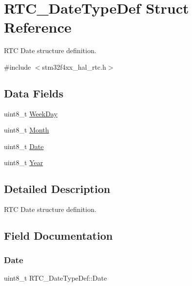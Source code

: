 \hypertarget{struct_r_t_c___date_type_def}{}\section{R\+T\+C\+\_\+\+Date\+Type\+Def Struct Reference}
\label{struct_r_t_c___date_type_def}


R\+TC Date structure definition.  




{\ttfamily \#include $<$stm32f4xx\+\_\+hal\+\_\+rtc.\+h$>$}

\subsection*{Data Fields}
\begin{DoxyCompactItemize}
\item 
uint8\+\_\+t \hyperlink{struct_r_t_c___date_type_def_aff0238fae9aa5fe6dc30ca2833878e45}{Week\+Day}
\item 
uint8\+\_\+t \hyperlink{struct_r_t_c___date_type_def_a3df66a922683acd4db5defe402c664a0}{Month}
\item 
uint8\+\_\+t \hyperlink{struct_r_t_c___date_type_def_a5c81723966bbed4ce8fbe68d1b590c8a}{Date}
\item 
uint8\+\_\+t \hyperlink{struct_r_t_c___date_type_def_a1e7d226d1da13713b7d6bbd18c00bd9b}{Year}
\end{DoxyCompactItemize}


\subsection{Detailed Description}
R\+TC Date structure definition. 

\subsection{Field Documentation}
\mbox{\label{struct_r_t_c___date_type_def_a5c81723966bbed4ce8fbe68d1b590c8a}} 
\subsubsection{\texorpdfstring{Date}{Date}}
{\footnotesize\ttfamily uint8\+\_\+t R\+T\+C\+\_\+\+Date\+Type\+Def\+::\+Date}

